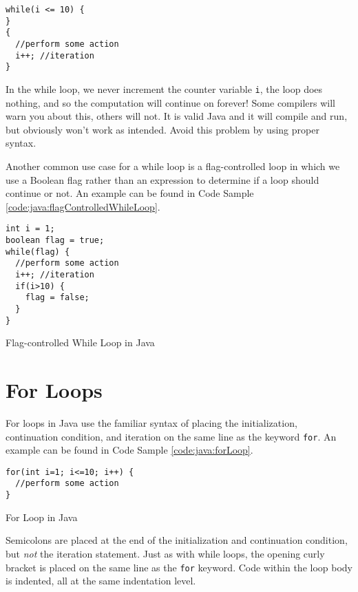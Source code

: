 \begin{verbatim}
while(i <= 10) {
}
{
  //perform some action
  i++; //iteration
}
\end{verbatim}

In the while loop, we never increment the counter variable \texttt{i}, 
the loop does nothing, and so the computation will continue on
forever!  Some compilers will warn you about this, others will not.  It
is valid Java and it will compile and run, but obviously won't work as intended.
Avoid this problem by using proper syntax.

Another common use case for a while loop is a flag-controlled loop in which
we use a Boolean flag rather than an expression to determine if a loop
should continue or not.  An example
can be found in Code Sample \ref{code:java:flagControlledWhileLoop}.

\begin{listing}
\begin{verbatim}
int i = 1;
boolean flag = true;
while(flag) {
  //perform some action
  i++; //iteration  
  if(i>10) {
    flag = false;
  }
}
\end{verbatim}
  \caption{Flag-controlled While Loop in Java}
  \label{code:java:flagControlledWhileLoop}
\end{listing}

\section{For Loops}

For loops in Java use the familiar syntax of placing the initialization, continuation
condition, and iteration on the same line as the keyword \texttt{for}.
An example can be found in Code Sample \ref{code:java:forLoop}.

\begin{listing}[H]
\begin{verbatim}
for(int i=1; i<=10; i++) {
  //perform some action
}
\end{verbatim}
  \caption{For Loop in Java}
  \label{code:java:forLoop}
\end{listing}

Semicolons are placed at the end of the initialization and
continuation condition, but \emph{not} the iteration statement.  Just as with while
loops, the opening curly bracket is placed on the same line as the \texttt{for}
keyword.  Code within the loop body is indented, all at the same indentation level.

